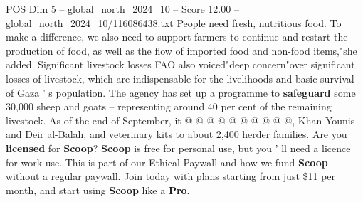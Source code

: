 \begin{textsample}{POS Dim 5 – global\_north\_2024\_10 – Score 12.00 – global\_north\_2024\_10/116086438.txt}
People need fresh, nutritious food.
To make a difference, we also need to support farmers to continue and restart the production of food, as well as the flow of imported food and non-food items,"she added.
Significant livestock losses FAO also voiced"deep concern"over significant losses of livestock, which are indispensable for the livelihoods and basic survival of Gaza ' s population.
The agency has set up a programme to \textbf{safeguard} some 30,000 sheep and goats -- representing around 40 per cent of the remaining livestock.
As of the end of September, it @ @ @ @ @ @ @ @ @ @, Khan Younis and Deir al-Balah, and veterinary kits to about 2,400 herder families.
Are you \textbf{licensed} for \textbf{Scoop}? \textbf{Scoop} is free for personal use, but you ' ll need a licence for work use.
This is part of our Ethical Paywall and how we fund \textbf{Scoop} without a regular paywall.
Join today with plans starting from just \$11 per month, and start using \textbf{Scoop} like a \textbf{Pro}.

\end{textsample}
